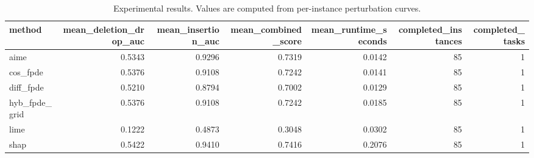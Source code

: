 \begin{table}[t]
\caption{Experimental results. Values are computed from per-instance perturbation curves.}
\label{tab:main_results_computed}
\centering
\begin{tabular}{lrrrrrr}
\toprule
method & mean\_deletion\_drop\_auc & mean\_insertion\_auc & mean\_combined\_score & mean\_runtime\_seconds & completed\_instances & completed\_tasks \\
\midrule
aime & 0.5343 & 0.9296 & 0.7319 & 0.0142 & 85 & 1 \\
cos\_fpde & 0.5376 & 0.9108 & 0.7242 & 0.0141 & 85 & 1 \\
diff\_fpde & 0.5210 & 0.8794 & 0.7002 & 0.0129 & 85 & 1 \\
hyb\_fpde\_grid & 0.5376 & 0.9108 & 0.7242 & 0.0185 & 85 & 1 \\
lime & 0.1222 & 0.4873 & 0.3048 & 0.0302 & 85 & 1 \\
shap & 0.5422 & 0.9410 & 0.7416 & 0.2076 & 85 & 1 \\
\bottomrule
\end{tabular}

\end{table}
